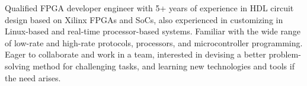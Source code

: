

\begin{cvparagraph}
Qualified FPGA developer engineer with 5+ years of experience in HDL circuit design based on Xilinx FPGAs and SoCs, also experienced in customizing in Linux-based and real-time processor-based systems. Familiar with the wide range of low-rate and high-rate protocols, processors, and microcontroller programming. Eager to collaborate and work in a team, interested in devising a better problem-solving method for challenging tasks, and learning new technologies and tools if the need arises.
\end{cvparagraph}
